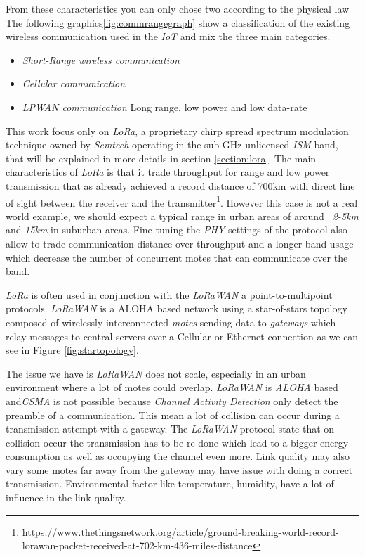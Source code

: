 From these characteristics you can only chose two according to the physical law %
The following graphics\ref{fig:commrangegraph} show a classification of the existing wireless communication used in the \emph{IoT} and mix the three main categories.

\begin{itemize}
    \item \emph{Short-Range wireless communication}
    \item \emph{Cellular communication}
    \item \emph{LPWAN communication} Long range, low power and low data-rate
\end{itemize}



This work focus only on \emph{LoRa}, a proprietary chirp spread spectrum modulation technique owned by \emph{Semtech} operating in the sub-GHz unlicensed \emph{ISM} band, that will be explained in more details in section \ref{section:lora}.
The main characteristics of \emph{LoRa} is that it trade throughput for range and low power transmission that as already achieved a record distance of 700km with direct line of sight between the receiver and the transmitter\footnote{https://www.thethingsnetwork.org/article/ground-breaking-world-record-lorawan-packet-received-at-702-km-436-miles-distance}. However this case is not a real world example, we should expect a typical range in urban areas of around \emph{~2-5km} and \emph{15km} in suburban areas\cite{8030482}. Fine tuning the \emph{PHY} settings of the protocol also allow to trade communication distance over throughput and a longer band usage which decrease the number of concurrent motes that can communicate over the band\cite{10.1145/2988287.2989163}.

\emph{LoRa} is often used in conjunction with the \emph{LoRaWAN} a point-to-multipoint protocols. \emph{LoRaWAN} is a ALOHA based\cite{loraalliance:lorawanspecification} network using a star-of-stars topology composed of
wirelessly interconnected \emph{motes} sending data to \emph{gateways} which relay messages to central servers over a Cellular or Ethernet connection as we can see in Figure \ref{fig:startopology}.



The issue we have is \emph{LoRaWAN} does not scale\cite{10.1145/2988287.2989163}, especially in an urban environment where a lot of motes could overlap. \emph{LoRaWAN} is \emph{ALOHA} based and\emph{CSMA} is not possible because \emph{Channel Activity Detection} only detect the preamble of a communication. This mean a lot of collision can occur during a transmission attempt with a gateway. The \emph{LoRaWAN} protocol state that on collision occur the transmission has to be re-done which lead to a bigger energy consumption as well as occupying the channel even more.
Link quality may also vary some motes far away from the gateway may have issue with doing a correct transmission. Environmental factor like temperature, humidity\cite{evaluation_of_the_reliability_of_lora}, have a lot of influence in the link quality.

